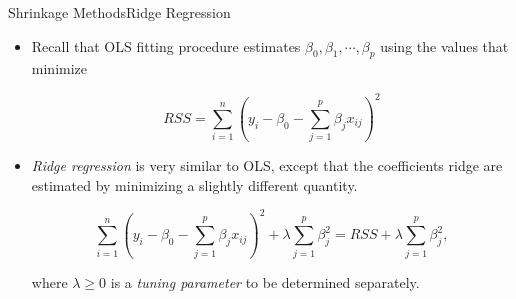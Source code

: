 \begin{frame}{Shrinkage Methods}{Ridge Regression}

\begin{itemize}
    \item Recall that OLS fitting procedure estimates $\beta_0 , \beta_1 , \cdots , \beta_p$ using the values that minimize \pause
    
    \begin{equation}
        RSS = \sum_{i=1}^n (y_i - \beta_0 - \sum_{j=1}^p  \beta_j x_{ij} )^2
    \end{equation} \pause 

    \item \textit{Ridge regression} is very similar to OLS, except that the coeﬃcients ridge are estimated by minimizing a slightly diﬀerent quantity. \pause 

    \begin{equation*}
        \sum_{i=1}^n (y_i - \beta_0 - \sum_{j=1}^p  \beta_j x_{ij} )^2 + \lambda \sum_{j=1}^p \beta_j^2 = RSS + \lambda \sum_{j=1}^p \beta_j^2,
    \end{equation*} \pause 

    where $\lambda \geq 0$ is a \textit{tuning parameter} to be determined separately.
\end{itemize}
    
\end{frame}

